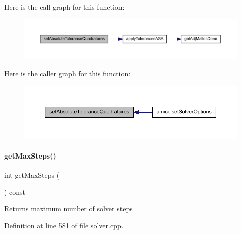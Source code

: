 Here is the call graph for this function\+:
\nopagebreak
\begin{figure}[H]
\begin{center}
\leavevmode
\includegraphics[width=350pt]{classamici_1_1_solver_af425163c5d98c472d17e080da4ee3b78_cgraph}
\end{center}
\end{figure}
Here is the caller graph for this function\+:
\nopagebreak
\begin{figure}[H]
\begin{center}
\leavevmode
\includegraphics[width=350pt]{classamici_1_1_solver_af425163c5d98c472d17e080da4ee3b78_icgraph}
\end{center}
\end{figure}
\mbox{\label{classamici_1_1_solver_acf39690ae4c940c7734fc3fadabb4d50}} 
\paragraph{\texorpdfstring{get\+Max\+Steps()}{getMaxSteps()}}
{\footnotesize\ttfamily int get\+Max\+Steps (\begin{DoxyParamCaption}{ }\end{DoxyParamCaption}) const}

\begin{DoxyReturn}{Returns}
maximum number of solver steps 
\end{DoxyReturn}


Definition at line 581 of file solver.\+cpp.

